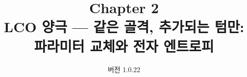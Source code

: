 

\renewcommand{\theequation}{2.\arabic{equation}}
\renewcommand{\thesection}{2.\arabic{section}}

\title{\textbf{\LARGE Chapter 2}\\[0.35em]\Large LCO 양극 --- 같은 골격, 추가되는 텀만: 파라미터 교체와 전자 엔트로피}
\author{}
\date{\normalsize 버전 1.0.22}


\maketitle












